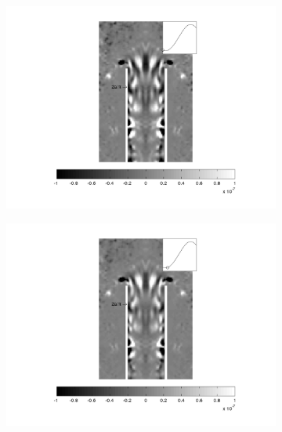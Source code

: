 \begin{landscape}
\newpage
\vfill
\begin{figure}[ht!]
\begin{subfigure}{0.55 \textwidth}
  \includegraphics[width=1.\linewidth]{figuras/max_ka_007_1.png}
  \caption[]{}
  \label{fig:max_007_1}
\end{subfigure}
\begin{subfigure}{0.55 \textwidth}
  \includegraphics[width=1.\linewidth]{figuras/max_ka_007_2.png}
  \caption[]{}
  \label{fig:max_007_2}
\end{subfigure}
\begin{subfigure}{0.55 \textwidth}

\end{subfigure}
\end{figure}
\end{landscape}
